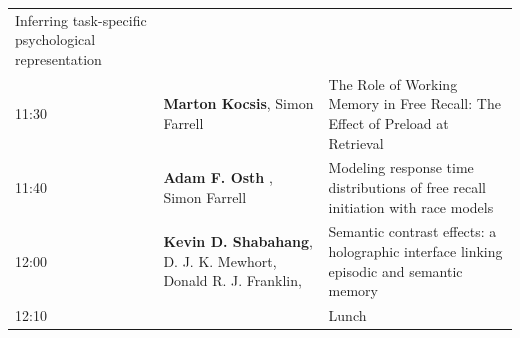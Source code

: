 \documentclass[]{article}
\begin{document}
\begin{longtable}[]{@{}lll@{}}
\begin{minipage}[t]{0.53\columnwidth}
Inferring task-specific psychological representation\strut
\end{minipage}\tabularnewline
\begin{minipage}[t]{0.03\columnwidth}\raggedright\strut
11:30\strut
\end{minipage} & \begin{minipage}[t]{0.35\columnwidth}\raggedright\strut
\textbf{Marton Kocsis}, Simon Farrell\strut
\end{minipage} & \begin{minipage}[t]{0.53\columnwidth}\raggedright\strut
The Role of Working Memory in Free Recall: The Effect of Preload at
Retrieval\strut
\end{minipage}\tabularnewline
\begin{minipage}[t]{0.03\columnwidth}\raggedright\strut
11:40\strut
\end{minipage} & \begin{minipage}[t]{0.35\columnwidth}\raggedright\strut
\textbf{Adam F. Osth} , Simon Farrell\strut
\end{minipage} & \begin{minipage}[t]{0.53\columnwidth}\raggedright\strut
Modeling response time distributions of free recall initiation with race
models\strut
\end{minipage}\tabularnewline
\begin{minipage}[t]{0.03\columnwidth}\raggedright\strut
12:00\strut
\end{minipage} & \begin{minipage}[t]{0.35\columnwidth}\raggedright\strut
\textbf{Kevin D. Shabahang}, D. J. K. Mewhort, Donald R. J.
Franklin,\strut
\end{minipage} & \begin{minipage}[t]{0.53\columnwidth}\raggedright\strut
Semantic contrast effects: a holographic interface linking episodic and
semantic memory\strut
\end{minipage}\tabularnewline
\begin{minipage}[t]{0.03\columnwidth}\raggedright\strut
12:10\strut
\end{minipage} & \begin{minipage}[t]{0.35\columnwidth}\raggedright\strut
\strut
\end{minipage} & \begin{minipage}[t]{0.53\columnwidth}\raggedright\strut
Lunch\strut
\end{minipage}\tabularnewline
\bottomrule
\end{longtable}
\end{document}
